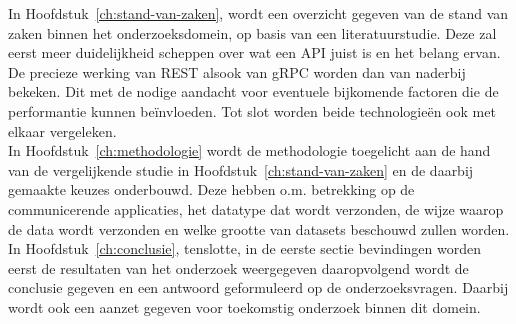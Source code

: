 In Hoofdstuk~\ref{ch:stand-van-zaken}, wordt een overzicht gegeven van de stand van zaken binnen het onderzoeksdomein, op basis van een literatuurstudie.
Deze zal eerst meer duidelijkheid scheppen over wat een API juist is en het belang ervan. De precieze werking van REST alsook van gRPC
worden dan van naderbij bekeken. Dit met de nodige aandacht voor eventuele bijkomende factoren die de performantie kunnen beïnvloeden.
Tot slot worden beide technologieën ook met elkaar vergeleken.\\

In Hoofdstuk~\ref{ch:methodologie} wordt de methodologie toegelicht aan de hand van de vergelijkende studie in Hoofdstuk~\ref{ch:stand-van-zaken} en de daarbij gemaakte keuzes onderbouwd.
Deze hebben o.m. betrekking op de communicerende applicaties, het datatype dat wordt verzonden, de wijze waarop de data wordt verzonden
en welke grootte van datasets beschouwd zullen worden.\\

In Hoofdstuk~\ref{ch:conclusie}, tenslotte, in de eerste sectie bevindingen worden eerst de resultaten van het onderzoek weergegeven daaropvolgend
wordt de conclusie gegeven en een antwoord geformuleerd op de onderzoeksvragen.
Daarbij wordt ook een aanzet gegeven voor toekomstig onderzoek binnen dit domein.